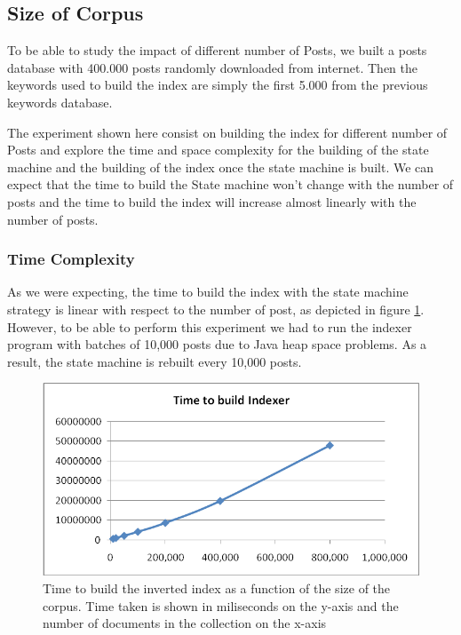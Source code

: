 \documentclass[10pt]{report}
\begin{document}
\subsection{Size of Corpus}
To be able to study the impact of different number of Posts, we built
a posts database with 400.000 posts randomly downloaded from
internet. Then the keywords used to build the index are simply the
first 5.000 from the previous keywords database. 

The experiment shown here consist on building the index for different
number of Posts and explore the time and space complexity for the
building of the state machine and the building of the index once the
state machine is built. We can expect that the time to build the State
machine won’t change with the number of posts and the time to build
the index will increase almost linearly with the number of posts.  


\subsubsection{Time Complexity}
As we were expecting, the time to build the index with the state
machine strategy is linear with respect to the number of post, as
depicted in figure \ref{fig:corpsizetimecomplexbuildindex}. However, to be able
to perform this experiment we had to run the indexer program with
batches of  10,000 posts due to Java heap space problems. As a result, the state
machine is rebuilt every 10,000 posts.  

\begin{figure}
  \begin{center}
    \includegraphics[width=\textwidth,height=!]{corpsizetimecomplexbuildindex}
  \end{center}
    \caption{Time to build the inverted index as a function of the
      size of the corpus. Time taken is shown in miliseconds on the
      y-axis and the number of documents in the collection on the
      x-axis} 
    \label{fig:corpsizetimecomplexbuildindex}
\end{figure} 
\end{document}
